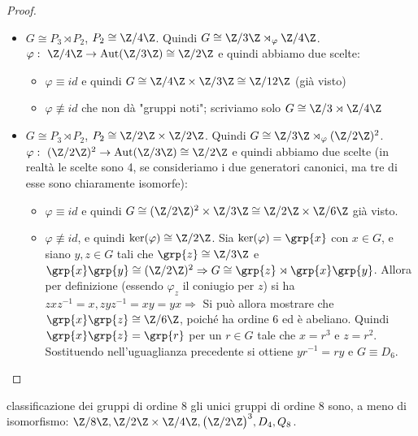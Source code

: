\begin{proof}
\begin{itemize}
\begin{itemize}
        \end{itemize} 
        \item $G \cong P_3 \rtimes P_2$, $P_2 \cong \Z / 4 \Z$. Quindi $G \cong  \Z / 3 \Z \rtimes_{\varphi} \Z / 4 \Z$. $\varphi : \  \Z / 4 \Z \rightarrow \text{Aut}(\Z / 3 \Z) \cong \Z / 2 \Z$ e quindi abbiamo due scelte:
        \begin{itemize}
            \item $\varphi \equiv id$ e quindi  $G \cong \Z / 4 \Z \times \Z / 3 \Z \cong \Z / 12 \Z$ (già visto)
            \item $\varphi \not\equiv id$ che non dà "gruppi noti"; scriviamo solo $G \cong \Z/3\rtimes \Z/4\Z$
        \end{itemize} 
        \item $G \cong P_3 \rtimes P_2$, $P_2 \cong \Z / 2 \Z \times \Z/2\Z$. Quindi $G \cong \Z / 3 \Z  \rtimes_{\varphi} (\Z/2\Z)^2$. $\varphi : \  (\Z/2\Z)^2  \rightarrow \text{Aut}(\Z / 3 \Z) \cong \Z / 2 \Z$ e quindi abbiamo due scelte (in realtà le scelte sono 4, se consideriamo i due generatori canonici, ma tre di esse sono chiaramente isomorfe):
        \begin{itemize}
            \item $\varphi \equiv id$ e quindi $G \cong (\Z / 2 \Z)^2 \times \Z / 3 \Z \cong  \Z / 2 \Z \times \Z / 6 \Z$ già visto. 
            \item $\varphi \not\equiv id$, e quindi $\ker(\varphi) \cong \Z/2\Z$. Sia $\ker(\varphi) = \grp{x}$ con $x \in G$, e siano $y,z \in G$ tali che $\grp{z} \cong \Z/3\Z$ e $\grp{x}\grp{y} \cong (\Z / 2 \Z)^2 \Rightarrow G \cong \grp{z} \rtimes \grp{x}\grp{y}$. Allora per definizione (essendo $\varphi_z$ il coniugio per $z$) si ha $zxz^{-1} = x, zyz^{-1} = xy = yx \Rightarrow $
        Si può allora mostrare che $\grp{x}\grp{z} \cong \Z/6\Z$, poiché ha ordine $6$ ed è abeliano. Quindi $\grp{x}\grp{z}=\grp{r}$ per un $r\in G$ tale che $x=r^3 \text{ e }z=r^2$. Sostituendo nell'uguaglianza precedente si ottiene $yr^{-1}=ry$ e $G\equiv D_6$.
        \end{itemize} 
    \end{itemize}
\end{proof}
\begin{example2}{classificazione dei gruppi di ordine 8}
    gli unici gruppi di ordine $8$ sono, a meno di isomorfismo: $\Z/8\Z, \Z/2\Z\times \Z/4\Z, \big(\Z/2\Z\big)^3, D_4,Q_8$.
\end{example2}
